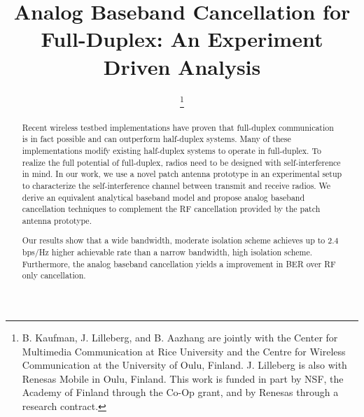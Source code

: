 \documentclass[12pt, journal,draftcls,letterpaper,onecolumn]{IEEEtran}
\begin{document}
\title{Analog Baseband Cancellation for Full-Duplex: An Experiment Driven Analysis}




\author{


\thanks{B. Kaufman, J. Lilleberg, and B. Aazhang are jointly with the Center for Multimedia Communication at Rice University and the Centre for Wireless Communication at the University of Oulu, Finland.  J. Lilleberg is also with Renesas Mobile in Oulu, Finland.  This work is funded in part by NSF, the Academy of Finland through the Co-Op grant, and by Renesas through a research contract.}}





















\maketitle

\begin{abstract}
Recent wireless testbed implementations have proven that full-duplex communication is in fact possible and can outperform half-duplex systems.  Many of these implementations modify existing half-duplex systems to operate in full-duplex.  To realize the full potential of full-duplex, radios need to be designed with self-interference in mind.  In our work, we use a novel patch antenna prototype in an experimental setup to characterize the self-interference channel between transmit and receive radios.  We derive an equivalent analytical baseband model and propose analog baseband cancellation techniques to complement the RF cancellation provided by the patch antenna prototype.   

Our results show that a wide bandwidth, moderate isolation scheme achieves up to 2.4 bps/Hz higher achievable rate than a narrow bandwidth, high isolation scheme.   Furthermore, the analog baseband cancellation yields a  improvement in BER over RF only cancellation.   

\end{abstract}
\end{document}
